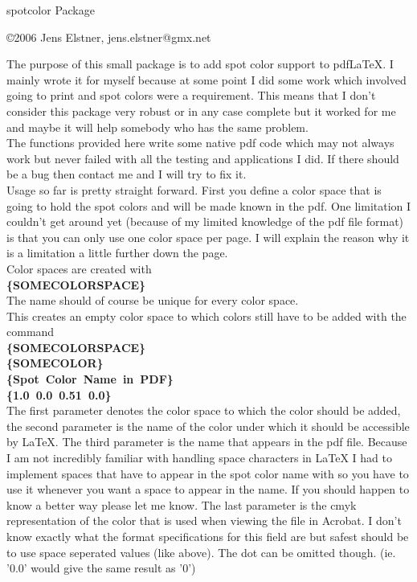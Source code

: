 \documentclass{article}
\begin{document}
	\setcounter{page}{1}
	\bf\Huge\color{black}\parbox[t]{\textwidth}{\centering spotcolor Package}\newline
	\rm\normalsize
	\parbox[t]{\textwidth}{\centering\copyright 2006 Jens Elstner, jens.elstner@gmx.net}\newline\newline
	The purpose of this small package is to add spot color support to pdfLaTeX. I mainly wrote it for myself because at some point I did some work which involved going to print and spot colors were a requirement. This means that I don't consider this package very robust or in any case complete but it worked for me and maybe it will help somebody who has the same problem.\\
	The functions provided here write some native pdf code which may not always work but never failed with all the testing and applications I did. If there should be a bug then contact me and I will try to fix it.\\
	Usage so far is pretty straight forward. First you define a color space that is going to hold the spot colors and will be made known in the pdf. One limitation I couldn't get around yet (because of my limited knowledge of the pdf file format) is that you can only use one color space per page. I will explain the reason why it is a limitation a little further down the page.\\
	Color spaces are created with\\
	\textbf{\string\CreateColorSpace\{SOMECOLORSPACE\}}\\
	The name should of course be unique for every color space.\\
	This creates an empty color space to which colors still have to be added with the command\\
	\textbf{\string\AddSpotColor\{SOMECOLORSPACE\}\\
															\{SOMECOLOR\}\\
															\{Spot\string\SpotSpace\ Color\string\SpotSpace\ Name\string\SpotSpace\ in\string\SpotSpace\ PDF\}\\
															\{1.0\ 0.0\ 0.51\ 0.0\}}\\
	The first parameter denotes the color space to which the color should be added, the second parameter is the name of the color under which it should be accessible by LaTeX. The third parameter is the name that appears in the pdf file. Because I am not incredibly familiar with handling space characters in LaTeX I had to implement spaces that have to appear in the spot color name with \textbf{\string\SpotSpace} so you have to use it whenever you want a space to appear in the name. If you should happen to know a better way please let me know. The last parameter is the cmyk representation of the color that is used when viewing the file in Acrobat. I don't know exactly what the format specifications for this field are but safest should be to use space seperated values (like above). The dot can be omitted though. (ie. '0.0' would give the same result as '0')\\
\end{document}
